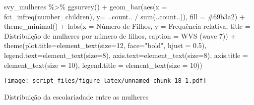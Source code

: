 \documentclass[
]{article}
\newenvironment{Shaded}{\begin{snugshade}}{\end{snugshade}}
\newcommand{\AttributeTok}[1]{\textcolor[rgb]{0.77,0.63,0.00}{#1}}
\newcommand{\DecValTok}[1]{\textcolor[rgb]{0.00,0.00,0.81}{#1}}
\newcommand{\FloatTok}[1]{\textcolor[rgb]{0.00,0.00,0.81}{#1}}
\newcommand{\FunctionTok}[1]{\textcolor[rgb]{0.00,0.00,0.00}{#1}}
\newcommand{\NormalTok}[1]{#1}
\newcommand{\SpecialCharTok}[1]{\textcolor[rgb]{0.00,0.00,0.00}{#1}}
\newcommand{\StringTok}[1]{\textcolor[rgb]{0.31,0.60,0.02}{#1}}
\begin{document}
\begin{Shaded}
\begin{Highlighting}[]
\NormalTok{svy\_mulheres }\SpecialCharTok{\%\textgreater{}\%}
  \FunctionTok{ggsurvey}\NormalTok{() }\SpecialCharTok{+}
  \FunctionTok{geom\_bar}\NormalTok{(}\FunctionTok{aes}\NormalTok{(}\AttributeTok{x =} \FunctionTok{fct\_infreq}\NormalTok{(number\_children), }\AttributeTok{y=}\NormalTok{ ..count.. }\SpecialCharTok{/} \FunctionTok{sum}\NormalTok{(..count..)), }\AttributeTok{fill =} \StringTok{\textquotesingle{}\#69b3a2\textquotesingle{}}\NormalTok{) }\SpecialCharTok{+}
  \FunctionTok{theme\_minimal}\NormalTok{() }\SpecialCharTok{+}
  \FunctionTok{labs}\NormalTok{(}\AttributeTok{x =} \StringTok{\textquotesingle{}Número de Filhos\textquotesingle{}}\NormalTok{,}
       \AttributeTok{y =} \StringTok{\textquotesingle{}Frequência relativa\textquotesingle{}}\NormalTok{,}
       \AttributeTok{title =} \StringTok{\textquotesingle{}Distribuição de mulheres por número de filhos\textquotesingle{}}\NormalTok{,}
       \AttributeTok{caption =} \StringTok{\textquotesingle{}WVS (wave 7)\textquotesingle{}}\NormalTok{) }\SpecialCharTok{+}
  \FunctionTok{theme}\NormalTok{(}\AttributeTok{plot.title=}\FunctionTok{element\_text}\NormalTok{(}\AttributeTok{size=}\DecValTok{12}\NormalTok{, }\AttributeTok{face=}\StringTok{"bold"}\NormalTok{, }\AttributeTok{hjust =} \FloatTok{0.5}\NormalTok{),}
        \AttributeTok{legend.text=}\FunctionTok{element\_text}\NormalTok{(}\AttributeTok{size=}\DecValTok{8}\NormalTok{),}
        \AttributeTok{axis.text=}\FunctionTok{element\_text}\NormalTok{(}\AttributeTok{size=}\DecValTok{8}\NormalTok{),}
        \AttributeTok{axis.title =} \FunctionTok{element\_text}\NormalTok{(}\AttributeTok{size =} \DecValTok{10}\NormalTok{),}
        \AttributeTok{legend.title =} \FunctionTok{element\_text}\NormalTok{(}\AttributeTok{size =} \DecValTok{10}\NormalTok{))}
\end{Highlighting}
\end{Shaded}

\texttt{[image: script\_files/figure-latex/unnamed-chunk-18-1.pdf]}

Distribuição da escolariadade entre as mulheres
\end{document}
